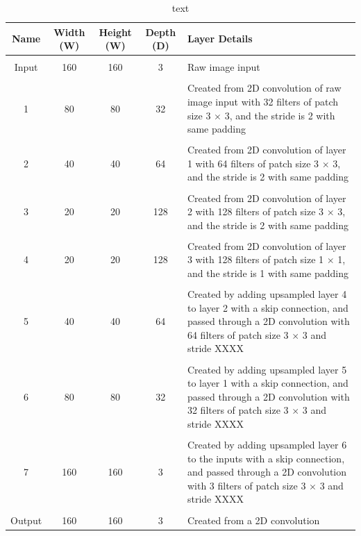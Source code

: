 \documentclass[a4paper]{article}
\begin{document}
\begin{table}[h]
\centering
\caption{text}\scriptsize
\begin{tabular}{ccccp{8cm}}
\toprule
\textbf{Name} & \textbf{Width (W)} & \textbf{Height (W)} & \textbf{Depth (D)} & Layer Details\\  
\midrule
 & & & &\\
Input & 160 & 160 & 3 & Raw image input\\
 & & & &\\
1 & 80 & 80 & 32 & Created from 2D convolution of raw image input with 32 filters of patch size 3 $\times $ 3, and the stride is 2 with same padding\\
 & & & &\\
2 & 40 & 40 & 64 & Created from 2D convolution of layer 1 with 64 filters of patch size 3 $\times $ 3, and the stride is 2 with same padding\\
 & & & &\\
3 & 20 & 20 & 128 & Created from 2D convolution of layer 2 with 128 filters of patch size 3 $\times$ 3, and the stride is 2 with same padding\\
 & & & &\\
4 & 20 & 20 & 128 & Created from 2D convolution of layer 3 with 128 filters of patch size 1 $\times$ 1, and the stride is 1 with same padding\\
 & & & &\\
5 & 40 & 40 & 64 & Created by adding upsampled layer 4 to layer 2 with a skip connection, and passed through a 2D convolution with 64 filters of patch size 3 $\times$ 3 and stride XXXX\\
 & & & &\\
6 & 80 & 80 & 32 & Created by adding upsampled layer 5 to layer 1 with a skip connection, and passed through a 2D convolution with 32 filters of patch size 3 $\times$ 3 and stride XXXX\\
 & & & &\\
7 & 160 & 160 & 3 & Created by adding upsampled layer 6 to the inputs with a skip connection, and passed through a 2D convolution with 3 filters of patch size 3 $\times$ 3 and stride XXXX\\
& & & &\\
Output & 160 & 160 & 3 & Created from a 2D convolution\\
\bottomrule
\end{tabular}
\end{table}

\newpage
\end{document}
